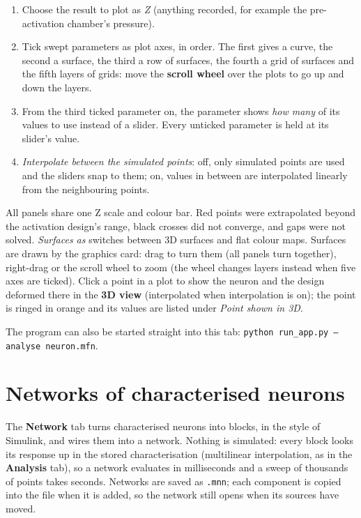 \documentclass[11pt,a4paper]{article}
\newcommand{\code}[1]{\texttt{#1}}
\newcommand{\menu}[1]{\textsf{\textbf{#1}}}
\begin{document}
\begin{enumerate}
\item Choose the result to plot as \emph{Z} (anything recorded, for example the pre-activation chamber's
  pressure).
\item Tick swept parameters as plot axes, in order. The first gives a curve, the second a surface, the third a row
  of surfaces, the fourth a grid of surfaces and the fifth layers of grids: move the \textbf{scroll wheel} over the
  plots to go up and down the layers.
\item From the third ticked parameter on, the parameter shows \emph{how many} of its values to use instead of a
  slider. Every unticked parameter is held at its slider's value.
\item \emph{Interpolate between the simulated points}: off, only simulated points are used and the sliders snap to
  them; on, values in between are interpolated linearly from the neighbouring points.
\end{enumerate}

All panels share one Z scale and colour bar. Red points were extrapolated beyond the activation design's range,
black crosses did not converge, and gaps were not solved. \emph{Surfaces as} switches between 3D surfaces and flat
colour maps. Surfaces are drawn by the graphics card: drag to turn them (all panels turn together), right-drag or the
scroll wheel to zoom (the wheel changes layers instead when five axes are ticked). Click a point in a plot to show the
neuron and the design deformed there in the \menu{3D view} (interpolated when interpolation is on); the point is
ringed in orange and its values are listed under \emph{Point shown in 3D}.

\begin{tip}
The program can also be started straight into this tab: \code{python run\_app.py --analyse neuron.mfn}.
\end{tip}

\section{Networks of characterised neurons}
\label{sec:network}

The \menu{Network} tab turns characterised neurons into blocks, in the style of Simulink, and wires them into a
network. Nothing is simulated: every block looks its response up in the stored characterisation (multilinear
interpolation, as in the \menu{Analysis} tab), so a network evaluates in milliseconds and a sweep of thousands of
points takes seconds. Networks are saved as \code{.mnn}; each component is copied into the file when it is added, so
the network still opens when its sources have moved.
\end{document}
